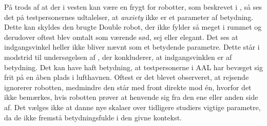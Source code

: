 %
På trods af at der i vesten kan være en frygt for robotter, som beskrevet i , så ses det på testpersonernes udtalelser, at \textit{anxiety} ikke er et parameter af betydning. Dette kan skyldes den brugte Double robot, der ikke fylder så meget i rummet og derudover oftest blev omtalt som værende sød, sej eller elegant. \blankline
%
Det ses at indgangsvinkel heller ikke bliver nævnt som et betydende parametre. Dette står i modstrid til undersøgelsen af \textcite{PDF:HowMayIServeYou}, der konkluderer, at indgangsvinklen er af betydning. Det kan have haft betydning, at testpersonerne i AAL har bevæget sig frit på en åben plads i lufthavnen. Oftest er det blevet observeret, at rejsende ignorerer robotten, medmindre den står med front direkte mod én, hvorfor det ikke bemærkes, hvis robotten prøver at henvende sig fra den ene eller anden side af. Det vælges ikke at danne nye skalaer over tidligere studiers vigtige parametre, da de ikke fremstå betydningsfulde i den givne kontekst. 







